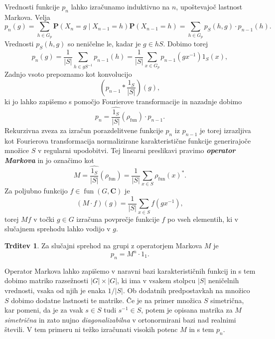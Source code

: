 \documentclass[11pt]{book}
\def\CC{\mathbf{C}}
\def\PP{\mathbf{P}}
\DeclareMathOperator\fun{fun}
\def\definicija{\color{rdeca}\bf\em}
\theoremstyle{definition}
\theoremstyle{zgled}
\theoremstyle{odprtproblem}
\theoremstyle{domacanaloga}
\theoremstyle{izrek}
\newtheorem*{trditev}{Trditev}
\begin{document}
Vrednosti funkcije $p_n$ lahko izračunamo induktivno na $n$, upoštevajoč lastnost Markova. Velja
\[
    p_n(g) 
    = \sum_{h \in G_p} \PP(X_n = g \mid X_{n-1} = h) \PP(X_{n-1} = h)
    = \sum_{h \in G_p} p_{S}(h,g) \cdot p_{n-1}(h).
\]
Vrednosti $p_{S}(h,g)$ so neničelne le, kadar je $g \in h S$. Dobimo torej
\[
    p_n(g)
    = \frac{1}{|S|} \sum_{h \in g S^{-1}} p_{n-1}(h)
    = \frac{1}{|S|} \sum_{x \in G_p} p_{n-1}(gx^{-1}) 1_{S}(x),
\]
Zadnjo vsoto prepoznamo kot konvolucijo
\[
    \left( p_{n-1} * \frac{1_{S}}{|S|} \right) (g),
\]
ki jo lahko zapišemo s pomočjo Fourierove transformacije in nazadnje dobimo
\[
    p_n = \widehat{\frac{1_{S}}{|S|} }(\rho_{\fun}) \cdot p_{n-1}.
\]
Rekurzivna zveza za izračun porazdelitvene funkcije $p_n$ iz $p_{n-1}$ je torej izrazljiva kot Fourierova transformacija normalizirane karakteristične funkcije generirajoče množice $S$ v regularni upodobitvi. Tej linearni preslikavi pravimo {\definicija operator Markova} in jo označimo kot
\[
    M = \widehat{\frac{1_{S}}{|S|} }(\rho_{\fun}) = \frac{1}{|S|} \sum_{x \in S} \rho_{\fun}(x)^*.
\]
Za poljubno funkcijo $f \in \fun(G,\CC)$ je 
\[
    (M \cdot f)(g) = \frac{1}{|S|} \sum_{x \in S} f(g x^{-1}),
\]
torej $Mf$ v točki $g \in G$ izračuna povprečje funkcije $f$ po vseh elementih, ki v slučajnem sprehodu lahko vodijo v $g$.

\begin{trditev}
Za slučajni sprehod na grupi z operatorjem Markova $M$ je
\[
    p_n = M^n \cdot 1_1.
\]
\end{trditev}

Operator Markova lahko zapišemo v naravni bazi karakterističnih funkcij in s tem dobimo matriko razsežnosti $|G| \times |G|$, ki ima v vsakem stolpcu $|S|$ neničelnih vrednosti, vsaka od njih je enaka $1/|S|$. Ob dodatnih predpostavkah na množico $S$ dobimo dodatne lastnosti te matrike. Če je na primer množica $S$ simetrična, kar pomeni, da je za vsak $s \in S$ tudi $s^{-1} \in S$, potem je opisana matrika za $M$ \emph{simetrična} in zato nujno \emph{diagonalizabilna} v ortonormirani bazi nad realnimi števili. V tem primeru ni težko izračunati visokih potenc $M$ in s tem $p_n$.
\end{document}
